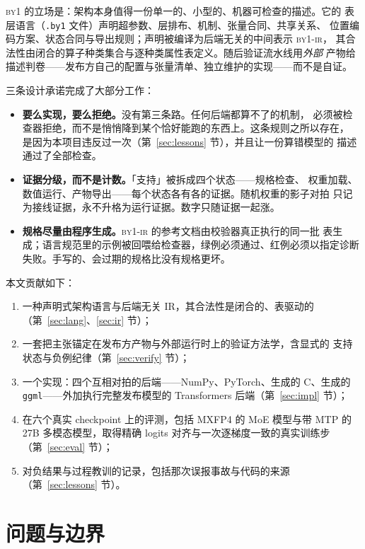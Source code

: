 \documentclass[11pt,a4paper]{ctexart}
\newcommand{\code}[1]{\texttt{#1}}
\newcommand{\byone}{\textsc{by1}}
\newcommand{\ir}{\textsc{by1-ir}}
\newcommand{\q}[1]{「#1」}
\begin{document}
\byone{} 的立场是：架构本身值得一份单一的、小型的、机器可检查的描述。它的
表层语言（\code{.by1} 文件）声明超参数、层排布、机制、张量合同、共享关系、
位置编码方案、状态合同与导出规则；声明被编译为后端无关的中间表示 \ir{}，
其合法性由闭合的算子种类集合与逐种类属性表定义。随后验证流水线用\emph{外部}
产物给描述判卷——发布方自己的配置与张量清单、独立维护的实现——而不是自证。

三条设计承诺完成了大部分工作：

\begin{itemize}
  \item \textbf{要么实现，要么拒绝。}没有第三条路。任何后端都算不了的机制，
  必须被检查器拒绝，而不是悄悄降到某个恰好能跑的东西上。这条规则之所以存在，
  是因为本项目违反过一次（第~\ref{sec:lessons} 节），并且让一份算错模型的
  描述通过了全部检查。
  \item \textbf{证据分级，而不是计数。}\q{支持}被拆成四个状态——规格检查、
  权重加载、数值运行、产物导出——每个状态各有各的证据。随机权重的影子对拍
  只记为接线证据，永不升格为运行证据。数字只随证据一起涨。
  \item \textbf{规格尽量由程序生成。}\ir{} 的参考文档由校验器真正执行的同一批
  表生成；语言规范里的示例被回喂给检查器，绿例必须通过、红例必须以指定诊断
  失败。手写的、会过期的规格比没有规格更坏。
\end{itemize}

本文贡献如下：
\begin{enumerate}
  \item 一种声明式架构语言与后端无关 IR，其合法性是闭合的、表驱动的
  （第~\ref{sec:lang}、\ref{sec:ir} 节）；
  \item 一套把主张锚定在发布方产物与外部运行时上的验证方法学，含显式的
  支持状态与负例纪律（第~\ref{sec:verify} 节）；
  \item 一个实现：四个互相对拍的后端——NumPy、PyTorch、生成的 C、生成的
  \code{ggml}——外加执行完整发布模型的 Transformers 后端（第~\ref{sec:impl} 节）；
  \item 在六个真实 checkpoint 上的评测，包括 MXFP4 的 MoE 模型与带 MTP 的
  27B 多模态模型，取得精确 logits 对齐与一次逐梯度一致的真实训练步
  （第~\ref{sec:eval} 节）；
  \item 对负结果与过程教训的记录，包括那次误报事故与代码的来源
  （第~\ref{sec:lessons} 节）。
\end{enumerate}

\section{问题与边界}
\label{sec:problem}
\end{document}
